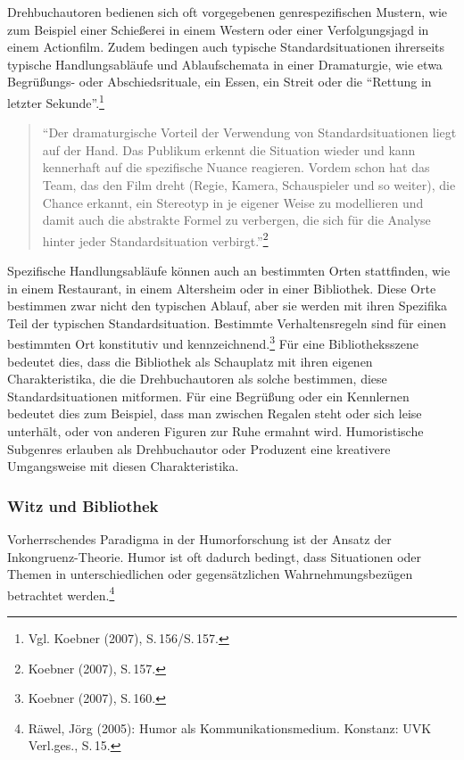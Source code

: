 Drehbuchautoren bedienen sich oft vorgegebenen genrespezifischen
Mustern, wie zum Beispiel einer Schießerei in einem Western oder einer
Verfolgungsjagd in einem Actionfilm. Zudem bedingen auch typische
Standardsituationen ihrerseits typische Handlungsabläufe und
Ablaufschemata in einer Dramaturgie, wie etwa Begrüßungs- oder
Abschiedsrituale, ein Essen, ein Streit oder die \enquote{Rettung in
letzter Sekunde}.\footnote{Vgl. Koebner (2007), S.\,156/S.\,157.}

\begin{flushleft}
\begin{quote}
\enquote{Der dramaturgische Vorteil der Verwendung von
Standardsituationen liegt auf der Hand. Das Publikum erkennt die
Situation wieder und kann kennerhaft auf die spezifische Nuance
reagieren. Vordem schon hat das Team, das den Film dreht (Regie, Kamera,
Schauspieler und so weiter), die Chance erkannt, ein Stereotyp in je
eigener Weise zu modellieren und damit auch die abstrakte Formel zu
verbergen, die sich für die Analyse hinter jeder Standardsituation
verbirgt.}\footnote{Koebner (2007), S.\,157.}
\end{quote}
\end{flushleft}

Spezifische Handlungsabläufe können auch an bestimmten Orten
stattfinden, wie in einem Restaurant, in einem Altersheim oder in einer
Bibliothek. Diese Orte bestimmen zwar nicht den typischen Ablauf, aber
sie werden mit ihren Spezifika Teil der typischen Standardsituation.
Bestimmte Verhaltensregeln sind für einen bestimmten Ort konstitutiv und
kennzeichnend.\footnote{Koebner (2007), S.\,160.} Für eine
Bibliotheksszene bedeutet dies, dass die Bibliothek als Schauplatz mit
ihren eigenen Charakteristika, die die Drehbuchautoren als solche
bestimmen, diese Standardsituationen mitformen. Für eine
Begrüßung oder ein Kennlernen bedeutet dies zum
Beispiel, dass man zwischen Regalen steht oder sich leise unterhält,
oder von anderen Figuren zur Ruhe ermahnt wird. Humoristische Subgenres
erlauben als Drehbuchautor oder Produzent eine kreativere Umgangsweise
mit diesen Charakteristika.

\subsubsection{Witz und Bibliothek}\label{witz-und-bibliothek}

Vorherrschendes Paradigma in der Humorforschung ist der Ansatz der
Inkongruenz-Theorie. Humor ist oft dadurch bedingt, dass Situationen
oder Themen in unterschiedlichen oder gegensätzlichen
Wahrnehmungsbezügen betrachtet werden.\footnote{Räwel, Jörg (2005):
  Humor als Kommunikationsmedium. Konstanz: UVK Verl.ges., S.\,15.}

